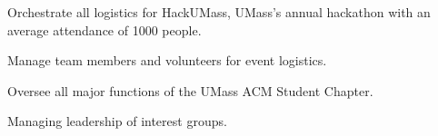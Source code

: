 
\begin{tightemize}
  \item Orchestrate all logistics for HackUMass, UMass's annual hackathon with
    an average attendance of 1000 people.
  \item Manage team members and volunteers for event logistics.
\end{tightemize}
\subsectionsep

\begin{tightemize}
  \item Oversee all major functions of the UMass ACM Student Chapter.
  \item Managing leadership of interest groups.
\end{tightemize}
